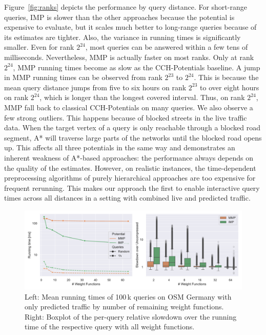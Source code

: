 \documentclass[a4paper,UKenglish,cleveref, autoref, thm-restate]{lipics-v2021}
\begin{document}
Figure~\ref{fig:ranks} depicts the performance by query distance.
For short-range queries, IMP is slower than the other approaches because the potential is expensive to evaluate, but it scales much better to long-range queries because of its estimates are tighter.
Also, the variance in running times is significantly smaller.
Even for rank $2^{24}$, most queries can be answered within a few tens of milliseconds.
Nevertheless, MMP is actually faster on most ranks.
Only at rank $2^{24}$, MMP running times become as slow as the CCH-Potentials baseline.
A jump in MMP running times can be observed from rank $2^{23}$ to $2^{24}$.
This is because the mean query distance jumps from five to six hours on rank $2^{23}$ to over eight hours on rank $2^{24}$, which is longer than the longest covered interval.
Thus, on rank $2^{24}$, MMP fall back to classical CCH-Potentials on many queries.
We also observe a few strong outliers.
This happens because of blocked streets in the live traffic data.
When the target vertex of a query is only reachable through a blocked road segment, A* will traverse large parts of the networks until the blocked road opens up.
This affects all three potentials in the same way and demonstrates an inherent weakness of A*-based approaches: the performance always depends on the quality of the estimates.
However, on realistic instances, the time-dependent preprocessing algorithms of purely hierarchical approaches are too expensive for frequent rerunning.
This makes our approach the first to enable interactive query times across all distances in a setting with combined live and predicted traffic.

\begin{figure}[!t]
\centering
\includegraphics[width=\linewidth]{fig/compression.pdf}
\caption{
Left: Mean running times of 100\,k queries on OSM Germany with only predicted traffic by number of remaining weight functions.
Right: Boxplot of the per-query relative slowdown over the running time of the respective query with all weight functions.
}\label{fig:compression}
\end{figure}
\end{document}
